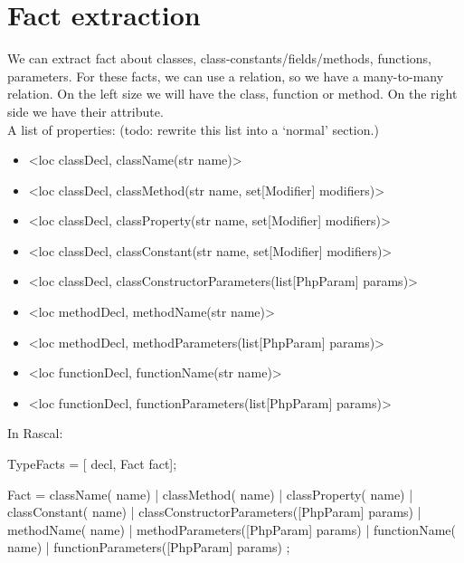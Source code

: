 \documentclass[../main.tex]{subfiles}
\begin{document}
    \section{Fact extraction}
    We can extract fact about classes, class-constants/fields/methods, functions, parameters.
    For these facts, we can use a relation, so we have a many-to-many relation.
    On the left size we will have the class, function or method. On the right side we have their attribute.
    \\
    A list of properties: (todo: rewrite this list into a `normal' section.) %
    \begin{itemize}
        \item \textless{}loc classDecl, className(str name)\textgreater{}
        \item \textless{}loc classDecl, classMethod(str name, set[Modifier] modifiers)\textgreater{}
        \item \textless{}loc classDecl, classProperty(str name, set[Modifier] modifiers)\textgreater{}
        \item \textless{}loc classDecl, classConstant(str name, set[Modifier] modifiers)\textgreater{}
        \item \textless{}loc classDecl, classConstructorParameters(list[PhpParam] params)\textgreater{}
        
        \item \textless{}loc methodDecl, methodName(str name)\textgreater{}
        \item \textless{}loc methodDecl, methodParameters(list[PhpParam] params)\textgreater{}
        
        \item \textless{}loc functionDecl, functionName(str name)\textgreater{}
        \item \textless{}loc functionDecl, functionParameters(list[PhpParam] params)\textgreater{}
    \end{itemize}
    
    In Rascal:
    \begin{rascal}
 TypeFacts = [ decl, Fact fact];

 Fact
    = className( name) 
    | classMethod( name)
    | classProperty( name)
    | classConstant( name)
    | classConstructorParameters([PhpParam] params)
    | methodName( name)
    | methodParameters([PhpParam] params)
    | functionName( name)
    | functionParameters([PhpParam] params)
    ;
    \end{rascal}
\end{document}
